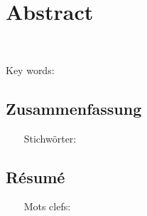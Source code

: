 

\cleardoublepage
\chapter*{Abstract}
~\newline~\newline~
\lipsum[1-2]
\vskip0.5cm
Key words: 


\begin{otherlanguage}{german}
\cleardoublepage
\chapter*{Zusammenfassung}
~\newline~\newline~
\lipsum[1-2]
\vskip0.5cm
Stichwörter: 
\end{otherlanguage}




\begin{otherlanguage}{french}
\cleardoublepage
\chapter*{Résumé}
~\newline~\newline~
\lipsum[1-2]
\vskip0.5cm
Mots clefs: 
\end{otherlanguage}


